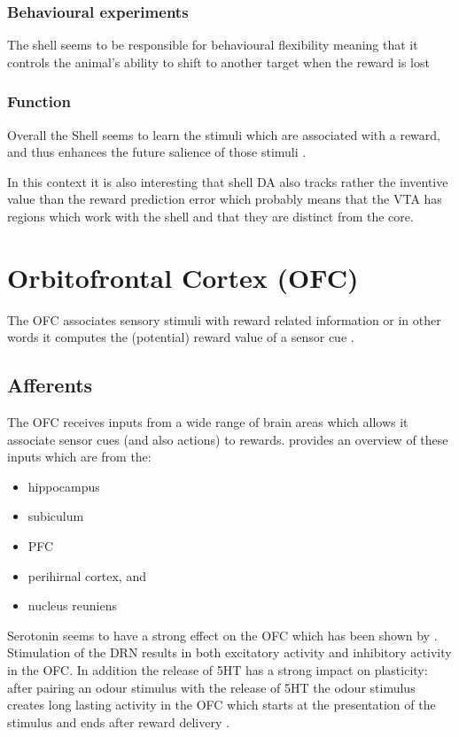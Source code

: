 \documentclass[12pt,a4paper]{article}
\begin{document}
\subsubsection{Behavioural experiments}
The shell seems to be responsible for behavioural flexibility meaning
that it controls the animal's ability to shift to another target when
the reward is lost \citep{Aquili2014}


\subsubsection{Function}
Overall the Shell seems to learn the stimuli which are associated with
a reward, and thus enhances the future salience of those stimuli
\citep{Cassidy2017}.

In this context it is also interesting that shell DA also tracks
rather the inventive value than the reward prediction error
\citep{Sackett2017} which probably means that the VTA has regions
which work with the shell and that they are distinct from the core.









\section{Orbitofrontal Cortex (OFC)}
The OFC associates sensory stimuli with reward related information
\citep{Schoenbaum.2009} or in other words it computes the (potential)
reward value of a sensor cue \citep{Wikenheiser2016,Bari2013}.

\subsection{Afferents}
The OFC receives inputs from a wide range of brain areas which allows
it associate sensor cues (and also actions) to
rewards. \citet{Wikenheiser2016} provides an overview of these inputs
which are from the:

\begin{itemize}
\item hippocampus
\item subiculum
\item PFC
\item perihirnal cortex, and
\item nucleus reuniens
\end{itemize}

Serotonin seems to have a strong effect on the OFC which has been
shown by \citet{Zhou2015}. Stimulation of the DRN results in both
excitatory activity and inhibitory activity in the OFC. In addition
the release of 5HT has a strong impact on plasticity: after pairing an
odour stimulus with the release of 5HT the odour stimulus creates long
lasting activity in the OFC which starts at the presentation of the
stimulus and ends after reward delivery \citep{Zhou2015}.
\end{document}
